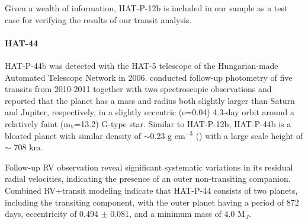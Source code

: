Given a wealth of information, HAT-P-12b is included in our sample as a test case for verifying the results of our transit analysis.

\paragraph{HAT-44}
HAT-P-44b was detected with the HAT-5 telescope of the Hungarian-made Automated Telescope Network %
in 2006. \cite{Hartmann2014} %
conducted follow-up photometry of five transits from 2010-2011 together with two spectroscopic observations and reported that the planet has a mass and radius %
both slightly larger than Saturn and Jupiter, respectively, in a slightly eccentric (e=0.04) %
4.3-day orbit around a relatively faint (m$_V$=13.2) G-type star.
Similar to HAT-P-12b, HAT-P-44b is a bloated planet with similar density of $\sim$0.23 g cm$^{-3}$ (\cite{Hartmann2014}) with a large scale height of $\sim$ 708 km.

Follow-up RV observation reveal significant systematic variations in its residual radial velocities, indicating the presence of an outer non-transiting companion. Combined RV+transit modeling indicate that HAT-P-44 consists of two planets, including the transiting component, with the outer planet having a period of 872 days, eccentricity of 0.494 $\pm$ 0.081, and a minimum mass of 4.0 M$_J$.

